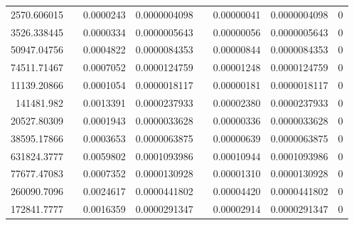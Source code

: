 \documentclass[
journal=jacsat, %
manuscript=article]{achemso}
\begin{document}
\begin{table}[htbp]
{\begin{tabular}{rrrrrrrr}
    2570.606015 &       & 0.0000243 & 0.0000004098 &       & 0.00000041 & 0.0000004098 & 0 \\
    3526.338445 &       & 0.0000334 & 0.0000005643 &       & 0.00000056 & 0.0000005643 & 0 \\
    50947.04756 &       & 0.0004822 & 0.0000084353 &       & 0.00000844 & 0.0000084353 & 0 \\
    74511.71467 &       & 0.0007052 & 0.0000124759 &       & 0.00001248 & 0.0000124759 & 0 \\
    11139.20866 &       & 0.0001054 & 0.0000018117 &       & 0.00000181 & 0.0000018117 & 0 \\
    141481.982 &       & 0.0013391 & 0.0000237933 &       & 0.00002380 & 0.0000237933 & 0 \\
    20527.80309 &       & 0.0001943 & 0.0000033628 &       & 0.00000336 & 0.0000033628 & 0 \\
    38595.17866 &       & 0.0003653 & 0.0000063875 &       & 0.00000639 & 0.0000063875 & 0 \\
    631824.3777 &       & 0.0059802 & 0.0001093986 &       & 0.00010944 & 0.0001093986 & 0 \\
    77677.47083 &       & 0.0007352 & 0.0000130928 &       & 0.00001310 & 0.0000130928 & 0 \\
    260090.7096 &       & 0.0024617 & 0.0000441802 &       & 0.00004420 & 0.0000441802 & 0 \\
    172841.7777 &       & 0.0016359 & 0.0000291347 &       & 0.00002914 & 0.0000291347 & 0 \\
 \bottomrule
    \end{tabular}%
    }
  \label{tab:addlabel}%
\end{table}%
\end{document}
